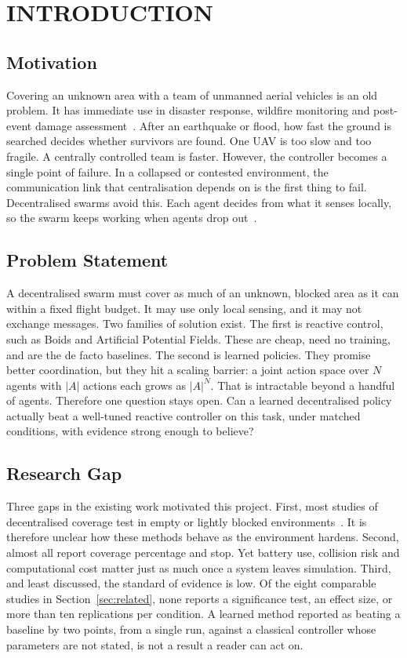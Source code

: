 \documentclass[a4paper, 10pt, conference]{ieeeconf}
\begin{document}
\section{INTRODUCTION}\label{sec:intro}

\subsection{Motivation}

Covering an unknown area with a team of unmanned aerial vehicles is an
old problem. It has immediate use in disaster response, wildfire
monitoring and post-event damage assessment~\cite{erdelj2017}. After
an earthquake or flood, how fast the ground is searched decides
whether survivors are found. One UAV is too slow and too fragile. A
centrally controlled team is faster. However, the controller becomes a
single point of failure. In a collapsed or contested environment, the
communication link that centralisation depends on is the first thing
to fail. Decentralised swarms avoid this. Each agent decides from what
it senses locally, so the swarm keeps working when agents drop
out~\cite{dorigo2021}.

\subsection{Problem Statement}

A decentralised swarm must cover as much of an unknown, blocked area
as it can within a fixed flight budget. It may use only local sensing,
and it may not exchange messages. Two families of solution exist. The
first is reactive control, such as Boids and Artificial Potential
Fields. These are cheap, need no training, and are the de facto
baselines. The second is learned policies. They promise better
coordination, but they hit a scaling barrier: a joint action space
over $N$ agents with $|A|$ actions each grows as $|A|^N$. That is
intractable beyond a handful of agents. Therefore one question stays
open. Can a learned decentralised policy actually beat a well-tuned
reactive controller on this task, under matched conditions, with
evidence strong enough to believe?

\subsection{Research Gap}

Three gaps in the existing work motivated this project. First, most
studies of decentralised coverage test in empty or lightly blocked
environments~\cite{zhu2023}. It is therefore unclear how these methods
behave as the environment hardens. Second, almost all report coverage
percentage and stop. Yet battery use, collision risk and computational
cost matter just as much once a system leaves simulation. Third, and
least discussed, the standard of evidence is low. Of the eight
comparable studies in Section~\ref{sec:related}, none reports a
significance test, an effect size, or more than ten replications per
condition. A learned method reported as beating a baseline by two
points, from a single run, against a classical controller whose
parameters are not stated, is not a result a reader can act on.
\end{document}

